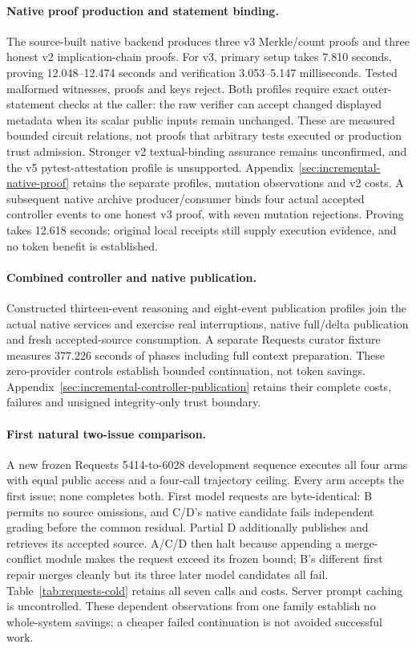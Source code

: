 \paragraph{Native proof production and statement binding.}
The source-built native backend produces three v3 Merkle/count proofs and three
honest v2 implication-chain proofs. For v3, primary setup takes 7.810
seconds, proving 12.048--12.474 seconds and verification
3.053--5.147 milliseconds. Tested malformed witnesses, proofs and
keys reject. Both profiles require exact outer-statement checks at the caller:
the raw verifier can accept changed displayed metadata when its scalar public
inputs remain unchanged. These are measured bounded circuit relations, not
proofs that arbitrary tests executed or production trust admission. Stronger
v2 textual-binding assurance remains unconfirmed, and the v5 pytest-attestation
profile is unsupported. Appendix~\ref{sec:incremental-native-proof} retains the
separate profiles, mutation observations and v2 costs. A subsequent native
archive producer/consumer binds four actual accepted controller events to one
honest v3 proof, with seven mutation rejections. Proving takes 12.618 seconds;
original local receipts still supply execution evidence, and no token benefit
is established.

\paragraph{Combined controller and native publication.}
Constructed thirteen-event reasoning and eight-event publication profiles join
the actual native services and exercise real interruptions, native full/delta
publication and fresh accepted-source consumption. A separate Requests curator
fixture measures 377.226 seconds of phases including full context
preparation. These zero-provider controls establish bounded continuation,
not token savings. Appendix~\ref{sec:incremental-controller-publication} retains
their complete costs, failures and unsigned integrity-only trust boundary.

\paragraph{First natural two-issue comparison.}
A new frozen Requests 5414-to-6028 development sequence executes all four
arms with equal public access and a four-call trajectory ceiling. Every arm
accepts the first issue; none completes both. First model requests are
byte-identical: B permits no source omissions, and C/D's native candidate
fails independent grading before the common residual. Partial D additionally
publishes and retrieves its accepted source. A/C/D then halt because appending
a merge-conflict module makes the request exceed its frozen bound; B's
different first repair merges cleanly but its three later model candidates
all fail. Table~\ref{tab:requests-cold} retains all seven calls and costs.
Server prompt caching is uncontrolled. These dependent observations from one
family establish no whole-system savings; a cheaper failed continuation is
not avoided successful work.

